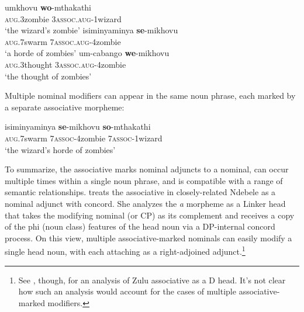 \documentclass[output=paper,colorlinks,citecolor=brown]{langscibook}
\begin{document}
\ea%
    \label{ex:halpert:10}
    \ea%
    \label{ex:halpert:10a}
    \gll    umkhovu \textbf{wo}-mthakathi\\
            \textsc{aug}.3zombie 3\textsc{assoc}.\textsc{aug}-1wizard\\
    \glt    `the wizard's zombie'%
    \ex%
    \label{ex:halpert:10b}
    \gll    isiminyaminya \textbf{se}-mikhovu\\
            \textsc{aug}.7swarm 7\textsc{assoc}.\textsc{aug}-4zombie\\
    \glt    `a horde of zombies' %
    \ex%
    \label{ex:halpert:10c}
    \gll    um-cabango \textbf{we}-mikhovu\\
            \textsc{aug}.3thought 3\textsc{assoc}.\textsc{aug}-4zombie\\
    \glt    `the thought of zombies' %
    \z 
\z 

Multiple nominal modifiers can appear in the same noun phrase, each marked by a separate associative morpheme:

\ea%
    \label{ex:halpert:11}
    \gll    isiminyaminya \textbf{se}-mikhovu \textbf{so}-mthakathi\\
            \textsc{aug}.7swarm 7\textsc{assoc}-4zombie 7\textsc{assoc}-1wizard\\
    \glt    `the wizard's horde of zombies'
\z 

To summarize, the associative marks nominal adjuncts to a nominal, can occur multiple times within a single noun phrase, and is compatible with a range of semantic relationships. \citet{Pietraszko2019} treats the associative in closely-related Ndebele as a nominal adjunct with concord. She analyzes the \textit{a} morpheme as a Linker head that takes the modifying nominal (or CP) as its complement and receives a copy of the  phi (noun class) features of the head noun via a DP-internal concord process.  On this view, multiple associative-marked nominals can easily modify a single head noun, with each attaching as a right-adjoined adjunct.\footnote{See \citet{Jones2018}, though, for an analysis of Zulu associative as a D head.  It's not clear how such an analysis would account for the cases of multiple associative-marked modifiers.} 
\end{document}
